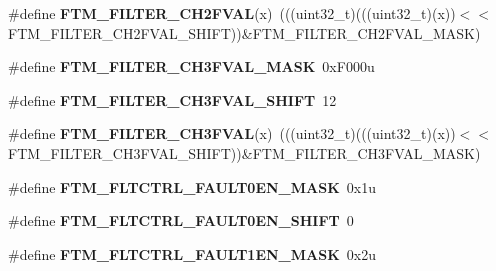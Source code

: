 \begin{DoxyCompactItemize}
\item 
\#define {\bfseries F\+T\+M\+\_\+\+F\+I\+L\+T\+E\+R\+\_\+\+C\+H2\+F\+V\+AL}(x)~(((uint32\+\_\+t)(((uint32\+\_\+t)(x))$<$$<$F\+T\+M\+\_\+\+F\+I\+L\+T\+E\+R\+\_\+\+C\+H2\+F\+V\+A\+L\+\_\+\+S\+H\+I\+FT))\&F\+T\+M\+\_\+\+F\+I\+L\+T\+E\+R\+\_\+\+C\+H2\+F\+V\+A\+L\+\_\+\+M\+A\+SK)\hypertarget{group__FTM__Register__Masks_ga56a86c7e68150dbdb4b8df6b3762d46d}{}\label{group__FTM__Register__Masks_ga56a86c7e68150dbdb4b8df6b3762d46d}

\item 
\#define {\bfseries F\+T\+M\+\_\+\+F\+I\+L\+T\+E\+R\+\_\+\+C\+H3\+F\+V\+A\+L\+\_\+\+M\+A\+SK}~0x\+F000u\hypertarget{group__FTM__Register__Masks_gadced1643670251bc672a6903b3cd7f29}{}\label{group__FTM__Register__Masks_gadced1643670251bc672a6903b3cd7f29}

\item 
\#define {\bfseries F\+T\+M\+\_\+\+F\+I\+L\+T\+E\+R\+\_\+\+C\+H3\+F\+V\+A\+L\+\_\+\+S\+H\+I\+FT}~12\hypertarget{group__FTM__Register__Masks_ga23a151bbeb877a2e2790071b9947bc30}{}\label{group__FTM__Register__Masks_ga23a151bbeb877a2e2790071b9947bc30}

\item 
\#define {\bfseries F\+T\+M\+\_\+\+F\+I\+L\+T\+E\+R\+\_\+\+C\+H3\+F\+V\+AL}(x)~(((uint32\+\_\+t)(((uint32\+\_\+t)(x))$<$$<$F\+T\+M\+\_\+\+F\+I\+L\+T\+E\+R\+\_\+\+C\+H3\+F\+V\+A\+L\+\_\+\+S\+H\+I\+FT))\&F\+T\+M\+\_\+\+F\+I\+L\+T\+E\+R\+\_\+\+C\+H3\+F\+V\+A\+L\+\_\+\+M\+A\+SK)\hypertarget{group__FTM__Register__Masks_ga777ead7813671a9cacf617c172c1181b}{}\label{group__FTM__Register__Masks_ga777ead7813671a9cacf617c172c1181b}

\item 
\#define {\bfseries F\+T\+M\+\_\+\+F\+L\+T\+C\+T\+R\+L\+\_\+\+F\+A\+U\+L\+T0\+E\+N\+\_\+\+M\+A\+SK}~0x1u\hypertarget{group__FTM__Register__Masks_ga55aa390cdac6997c93f7385ab41047ce}{}\label{group__FTM__Register__Masks_ga55aa390cdac6997c93f7385ab41047ce}

\item 
\#define {\bfseries F\+T\+M\+\_\+\+F\+L\+T\+C\+T\+R\+L\+\_\+\+F\+A\+U\+L\+T0\+E\+N\+\_\+\+S\+H\+I\+FT}~0\hypertarget{group__FTM__Register__Masks_gafa7b6c89e0fe43e698c029defe0c227e}{}\label{group__FTM__Register__Masks_gafa7b6c89e0fe43e698c029defe0c227e}

\item 
\#define {\bfseries F\+T\+M\+\_\+\+F\+L\+T\+C\+T\+R\+L\+\_\+\+F\+A\+U\+L\+T1\+E\+N\+\_\+\+M\+A\+SK}~0x2u\hypertarget{group__FTM__Register__Masks_gad7d98277395370cf8e028048aa97d3c3}{}\label{group__FTM__Register__Masks_gad7d98277395370cf8e028048aa97d3c3}


\end{DoxyCompactItemize}
